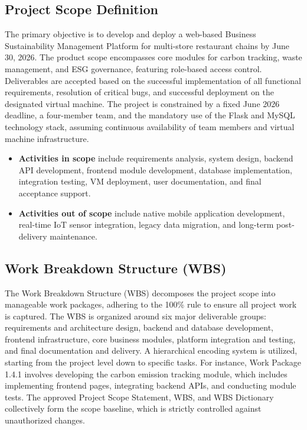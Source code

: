 \documentclass[12pt,a4paper]{article}
\begin{document}
\subsection{Project Scope Definition}
The primary objective is to develop and deploy a web-based Business Sustainability Management Platform for multi-store restaurant chains by June 30, 2026. The product scope encompasses core modules for carbon tracking, waste management, and ESG governance, featuring role-based access control. Deliverables are accepted based on the successful implementation of all functional requirements, resolution of critical bugs, and successful deployment on the designated virtual machine. The project is constrained by a fixed June 2026 deadline, a four-member team, and the mandatory use of the Flask and MySQL technology stack, assuming continuous availability of team members and virtual machine infrastructure.

\begin{itemize}
    \item \textbf{Activities in scope} include requirements analysis, system design, backend API development, frontend module development, database implementation, integration testing, VM deployment, user documentation, and final acceptance support.
    \item \textbf{Activities out of scope} include native mobile application development, real-time IoT sensor integration, legacy data migration, and long-term post-delivery maintenance.
\end{itemize}


\subsection{Work Breakdown Structure (WBS)}
The Work Breakdown Structure (WBS) decomposes the project scope into manageable work packages, adhering to the 100\% rule to ensure all project work is captured. The WBS is organized around six major deliverable groups: requirements and architecture design, backend and database development, frontend infrastructure, core business modules, platform integration and testing, and final documentation and delivery. A hierarchical encoding system is utilized, starting from the project level down to specific tasks. For instance, Work Package 1.4.1 involves developing the carbon emission tracking module, which includes implementing frontend pages, integrating backend APIs, and conducting module tests. The approved Project Scope Statement, WBS, and WBS Dictionary collectively form the scope baseline, which is strictly controlled against unauthorized changes.
\end{document}
